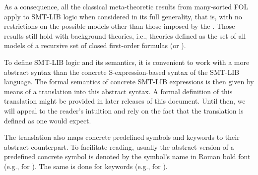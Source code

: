 As a consequence, all the classical meta-theoretic results from many-sorted 
FOL apply to SMT-LIB logic when considered in its full generality, that is,
with no restrictions on the possible models other than those imposed 
by the  .
Those results still hold with  
background theories, i.e., theories defined as the set of all models
of a recursive set of closed first-order formulas (or ).
\medskip

To define SMT-LIB logic and its semantics, it is convenient to work 
with a more abstract syntax than the concrete S-expression-based syntax 
of the SMT-LIB language.
The formal semantics of concrete SMT-LIB expressions is then given by means 
of a translation into this abstract syntax.
A formal definition of this translation might be provided in later releases 
of this document.
Until then, we will appeal to the reader's intuition and rely on the fact that 
the translation is defined as one would expect.

The translation also maps concrete predefined symbols and keywords
to their abstract counterpart.
To facilitate reading, usually the abstract version of 
a predefined concrete symbol is denoted by the symbol's name 
in Roman bold font (e.g.,  for ).
The same is done for keywords (e.g.,  for ).

